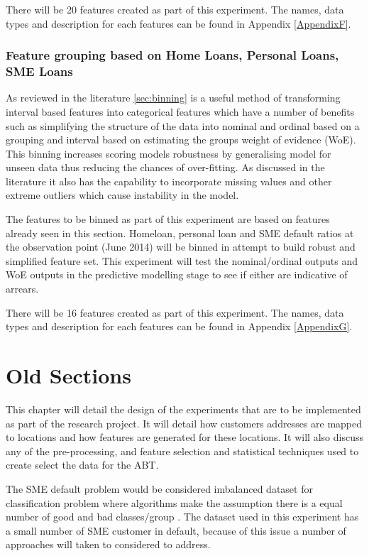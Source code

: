 There will be 20 features created as part of this experiment. The names, data types and description for each features can be found in Appendix \ref{AppendixF}.

\subsubsection{Feature grouping based on Home Loans, Personal Loans, SME Loans}
As reviewed in the literature \ref{sec:binning} is a useful method of transforming interval based features into categorical features which have a number of benefits such as simplifying the structure of the data into nominal and ordinal based on a grouping and interval based on estimating the groups weight of evidence (WoE). This binning increases scoring models robustness by generalising model for unseen data thus reducing the chances of over-fitting. As discussed in the literature it also has the capability to incorporate missing values and other extreme outliers which cause instability in the model. 

The features to be binned as part of this experiment are based on features already seen in this section. Homeloan, personal loan and SME default ratios at the observation point (June 2014) will be binned in attempt to build robust and simplified feature set. This experiment will test the nominal/ordinal outputs and WoE outputs in the predictive modelling stage to see if either are indicative of arrears. 


There will be 16 features created as part of this experiment. The names, data types and description for each features can be found in Appendix \ref{AppendixG}.

\pagebreak


\section{Old Sections}
This chapter will detail the design of the experiments that are to be implemented as part of the research project. It will detail how customers addresses are mapped to locations and how features are generated for these locations. It will also discuss any of the pre-processing, and feature selection and statistical techniques used to create select the data for the ABT.

The SME default problem would be considered imbalanced dataset for classification problem where algorithms make the assumption there is a equal number of good and bad classes/group \citep{japkowicz_class_2000}. The dataset used in this experiment has a small number of SME customer in default, because of this issue a number of approaches will taken to considered to address.

